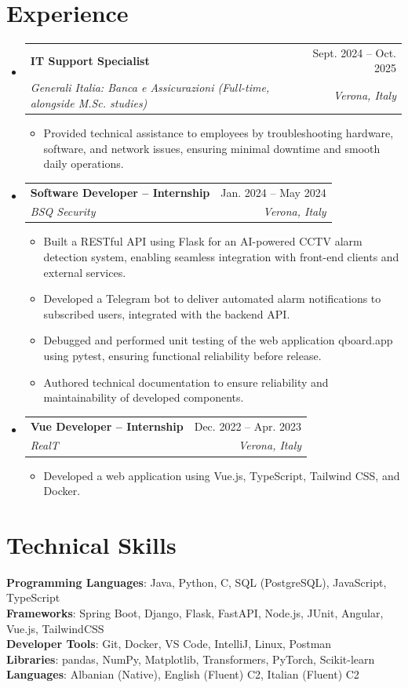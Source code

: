 \documentclass[a4paper,11pt]{article}
\makeatletter
\newcommand{\resumeItem}[1]{
  \item\small{
    {#1 \vspace{-2pt}}
  }
}
\newcommand{\resumeSubheading}[4]{
  \vspace{-2pt}\item
    \begin{tabular*}{0.97\textwidth}[t]{l@{\extracolsep{\fill}}r}
      \textbf{#1} & #2 \\
      \textit{\small#3} & \textit{\small #4} \\
    \end{tabular*}\vspace{-7pt}
}
\newcommand{\resumeSubHeadingListStart}{\begin{itemize}[leftmargin=0.15in, label={}]}
\newcommand{\resumeSubHeadingListEnd}{\end{itemize}}
\newcommand{\resumeItemListStart}{\begin{itemize}}
\newcommand{\resumeItemListEnd}{\end{itemize}\vspace{-5pt}}
\makeatother
\begin{document}
\section{Experience}
  \resumeSubHeadingListStart

    \resumeSubheading
      {IT Support Specialist}{Sept. 2024 -- Oct. 2025}
      {Generali Italia: Banca e Assicurazioni \normalfont\textit{(Full-time, alongside M.Sc. studies)}}{Verona, Italy}
      \resumeItemListStart
        \resumeItem{Provided technical assistance to employees by troubleshooting hardware, software, and network issues, ensuring minimal downtime and smooth daily operations.}
      \resumeItemListEnd

    \resumeSubheading
      {Software Developer -- Internship}{Jan. 2024 -- May 2024}
      {BSQ Security}{Verona, Italy}
      \resumeItemListStart
        \resumeItem{Built a RESTful API using Flask for an AI-powered CCTV alarm detection system, enabling seamless integration with front-end clients and external services.}
        \resumeItem{Developed a Telegram bot to deliver automated alarm notifications to subscribed users, integrated with the backend API.}
        \resumeItem{Debugged and performed unit testing of the web application qboard.app using pytest, ensuring functional reliability before release.}
        \resumeItem{Authored technical documentation to ensure reliability and maintainability of developed components.}
      \resumeItemListEnd

    \resumeSubheading
      {Vue Developer -- Internship}{Dec. 2022 -- Apr. 2023}
      {RealT}{Verona, Italy}
      \resumeItemListStart
        \resumeItem{Developed a web application using Vue.js, TypeScript, Tailwind CSS, and Docker.}
      \resumeItemListEnd

  \resumeSubHeadingListEnd


\section{Technical Skills}
 \begin{itemize}[leftmargin=0.15in, label={}]
    \small{\item{
     \textbf{Programming Languages}{: Java, Python, C, SQL (PostgreSQL), JavaScript, TypeScript} \\
     \textbf{Frameworks}{: Spring Boot, Django, Flask, FastAPI, Node.js, JUnit, Angular, Vue.js, TailwindCSS} \\
     \textbf{Developer Tools}{: Git, Docker, VS Code, IntelliJ, Linux, Postman} \\
     \textbf{Libraries}{: pandas, NumPy, Matplotlib, Transformers, PyTorch, Scikit-learn} \\
     \textbf{Languages}{: Albanian (Native), English (Fluent) C2, Italian (Fluent) C2}
    }}
 \end{itemize}
\end{document}
